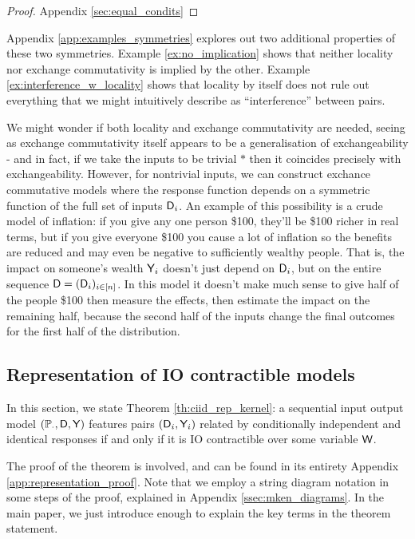\begin{proof}
Appendix \ref{sec:equal_condits}
\end{proof}

Appendix \ref{app:examples_symmetries} explores out two additional properties of these two symmetries. Example \ref{ex:no_implication} shows that neither locality nor exchange commutativity is implied by the other. Example \ref{ex:interference_w_locality} shows that locality by itself does not rule out everything that we might intuitively describe as ``interference'' between pairs.

We might wonder if both locality and exchange commutativity are needed, seeing as exchange commutativity itself appears to be a generalisation of exchangeability - and in fact, if we take the inputs to be trivial $*$ then it coincides precisely with exchangeability. However, for nontrivial inputs, we can construct exchance commutative models where the response function depends on a symmetric function of the full set of inputs $\mathsf{D}_i$. An example of this possibility is a crude model of inflation: if you give any one person \$100, they'll be \$100 richer in real terms, but if you give everyone \$100 you cause a lot of inflation so the benefits are reduced and may even be negative to sufficiently wealthy people. That is, the impact on someone's wealth $\mathsf{Y}_i$ doesn't just depend on $\mathsf{D}_i$, but on the entire sequence $\mathsf{D} = (\mathsf{D}_i)_{i\in [n]}$. In this model it doesn't make much sense to give half of the people \$100 then measure the effects, then estimate the impact on the remaining half, because the second half of the inputs change the final outcomes for the first half of the distribution.

\subsection[Representation]{Representation of IO contractible models}\label{sec:rep_theorem}

In this section, we state Theorem \ref{th:ciid_rep_kernel}: a sequential input output model $(\mathbb{P}_\cdot,\mathsf{D},\mathsf{Y})$ features pairs $(\mathsf{D}_i,\mathsf{Y}_i)$ related by conditionally independent and identical responses if and only if it is IO contractible over some variable $\mathsf{W}$.

The proof of the theorem is involved, and can be found in its entirety Appendix \ref{app:representation_proof}. Note that we employ a string diagram notation in some steps of the proof, explained in Appendix \ref{ssec:mken_diagrams}. In the main paper, we just introduce enough to explain the key terms in the theorem statement. 

